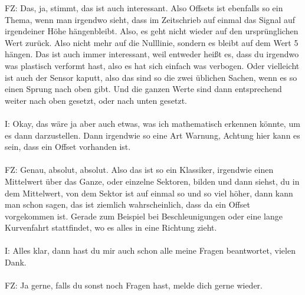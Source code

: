 \begin{linenumbers}
FZ: Das, ja, stimmt, das ist auch interessant. Also Offsets ist ebenfalls so ein Thema, wenn man irgendwo sieht, dass im Zeitschrieb auf einmal das Signal auf irgendeiner Höhe hängenbleibt. Also, es geht nicht wieder auf den ursprünglichen Wert zurück. Also nicht mehr auf die Nulllinie, sondern es bleibt auf dem Wert 5 hängen. Das ist auch immer interessant, weil entweder heißt es, dass du irgendwo was plastisch verformt hast, also es hat sich einfach was verbogen. Oder vielleicht ist auch der Sensor kaputt, also das sind so die zwei üblichen Sachen, wenn es so einen Sprung nach oben gibt. Und die ganzen Werte sind dann entsprechend weiter nach oben gesetzt, oder nach unten gesetzt.\\\\
I: Okay, das wäre ja aber auch etwas, was ich mathematisch erkennen könnte, um es dann darzustellen. Dann irgendwie so eine Art Warnung, Achtung hier kann es sein, dass ein Offset vorhanden ist.\\\\
FZ: Genau, absolut, absolut. Also das ist so ein Klassiker, irgendwie einen Mittelwert über das Ganze, oder einzelne Sektoren, bilden und dann siehst, du in dem Mittelwert, von dem Sektor ist auf einmal so und so viel höher, dann kann man schon sagen, das ist ziemlich wahrscheinlich, dass da ein Offset vorgekommen ist. Gerade zum Beispiel bei Beschleunigungen oder eine lange Kurvenfahrt stattfindet, wo es alles in eine Richtung zieht.\\\\
I: Alles klar, dann hast du mir auch schon alle meine Fragen beantwortet, vielen Dank.\\\\
FZ: Ja gerne, falls du sonst noch Fragen hast, melde dich gerne wieder. 
\end{linenumbers}